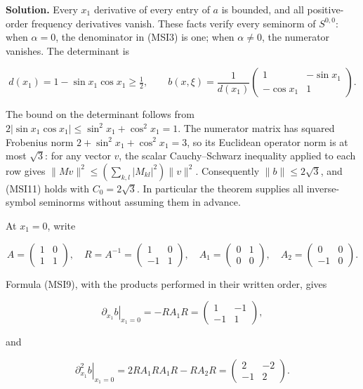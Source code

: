 \documentclass[
  11pt,
]{article}
\begin{document}
\textbf{Solution.} Every \(x_1\) derivative of every entry of \(a\) is
bounded, and all positive-order frequency derivatives vanish. These
facts verify every seminorm of \(S^{0,0}\): when \(\alpha=0\), the
denominator in (MSI3) is one; when \(\alpha\ne0\), the numerator
vanishes. The determinant is

\[
d(x_1)=1-\sin x_1\cos x_1\geq\tfrac12,
\qquad
b(x,\xi)=\frac1{d(x_1)}
\begin{pmatrix}1&-\sin x_1\\-\cos x_1&1\end{pmatrix}.
\tag{MSI39}
\]

The bound on the determinant follows from
\(2|\sin x_1\cos x_1|\leq\sin^2x_1+\cos^2x_1=1\). The numerator matrix
has squared Frobenius norm \(2+\sin^2x_1+\cos^2x_1=3\), so its Euclidean
operator norm is at most \(\sqrt3\): for any vector \(v\), the scalar
Cauchy--Schwarz inequality applied to each row gives
\(\|Mv\|^2\leq(\sum_{k,l}|M_{kl}|^2)\|v\|^2\). Consequently
\(\|b\|\leq2\sqrt3\), and (MSI11) holds with \(C_0=2\sqrt3\). In
particular the theorem supplies all inverse-symbol seminorms without
assuming them in advance.

At \(x_1=0\), write

\[
A=\begin{pmatrix}1&0\\1&1\end{pmatrix},
\quad R=A^{-1}=\begin{pmatrix}1&0\\-1&1\end{pmatrix},
\quad A_1=\begin{pmatrix}0&1\\0&0\end{pmatrix},
\quad A_2=\begin{pmatrix}0&0\\-1&0\end{pmatrix}.
\tag{MSI40}
\]

Formula (MSI9), with the products performed in their written order,
gives

\[
\left.\partial_{x_1}b\right|_{x_1=0}
=-RA_1R
=\begin{pmatrix}1&-1\\-1&1\end{pmatrix},
\tag{MSI41}
\]

and

\[
\left.\partial_{x_1}^2b\right|_{x_1=0}
=2RA_1RA_1R-RA_2R
=\begin{pmatrix}2&-2\\-1&2\end{pmatrix}.
\tag{MSI42}
\]
\end{document}

